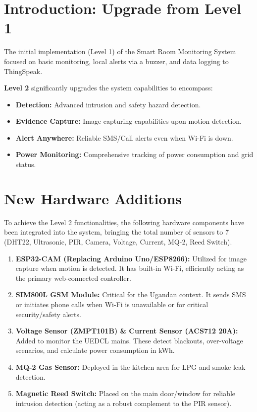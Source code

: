 \documentclass[12pt,a4paper]{article}
\begin{document}
\newpage
\tableofcontents
\newpage

\section{Introduction: Upgrade from Level 1}
The initial implementation (Level 1) of the Smart Room Monitoring System focused on basic monitoring, local alerts via a buzzer, and data logging to ThingSpeak. 

\textbf{Level 2} significantly upgrades the system capabilities to encompass:
\begin{itemize}
    \item \textbf{Detection:} Advanced intrusion and safety hazard detection.
    \item \textbf{Evidence Capture:} Image capturing capabilities upon motion detection.
    \item \textbf{Alert Anywhere:} Reliable SMS/Call alerts even when Wi-Fi is down.
    \item \textbf{Power Monitoring:} Comprehensive tracking of power consumption and grid status.
\end{itemize}

\section{New Hardware Additions}
To achieve the Level 2 functionalities, the following hardware components have been integrated into the system, bringing the total number of sensors to 7 (DHT22, Ultrasonic, PIR, Camera, Voltage, Current, MQ-2, Reed Switch).

\begin{enumerate}
    \item \textbf{ESP32-CAM (Replacing Arduino Uno/ESP8266):} Utilized for image capture when motion is detected. It has built-in Wi-Fi, efficiently acting as the primary web-connected controller.
    \item \textbf{SIM800L GSM Module:} Critical for the Ugandan context. It sends SMS or initiates phone calls when Wi-Fi is unavailable or for critical security/safety alerts.
    \item \textbf{Voltage Sensor (ZMPT101B) \& Current Sensor (ACS712 20A):} Added to monitor the UEDCL mains. These detect blackouts, over-voltage scenarios, and calculate power consumption in kWh.
    \item \textbf{MQ-2 Gas Sensor:} Deployed in the kitchen area for LPG and smoke leak detection.
    \item \textbf{Magnetic Reed Switch:} Placed on the main door/window for reliable intrusion detection (acting as a robust complement to the PIR sensor).
\end{enumerate}
\end{document}
